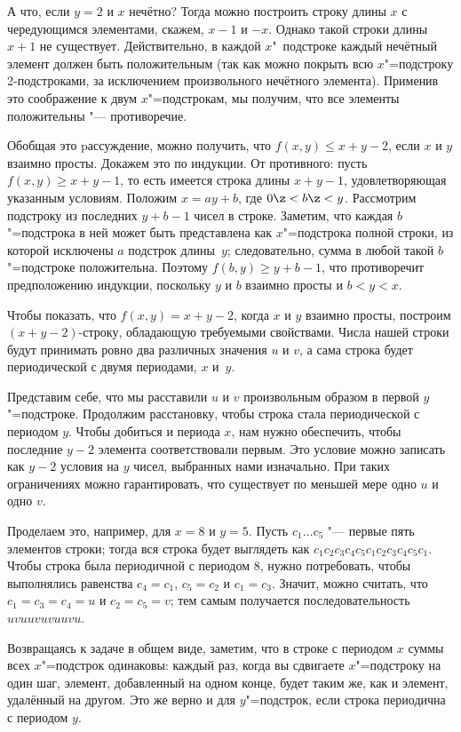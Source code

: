 \documentclass[twoside]{book}
\begin{document}
А что, если $y=2$ и $x$ нечётно?  Тогда можно построить строку длины
$x$ с чередующимся элементами, скажем, $x-1$ и $-x$.
Однако такой
строки длины $x+1$ не существует.
Действительно, в каждой
$x$"~подстроке каждый нечётный элемент должен быть положительным (так
как можно покрыть всю $x$"=подстроку 2-подстроками, за исключением
произвольного нечётного элемента).
Применив это соображение к двум
$x$"=подстрокам, мы получим, что все элементы положительны "---
противоречие.

Обобщая это pассуждение, можно получить, что $f(x,y)\le x+y-2$, если $x$ и $y$ взаимно просты.
Докажем это по индукции.
От противного: пусть $f(x,y)\ge x+y-1$,
то есть имеется строка длины $x+y-1$, удовлетворяющая указанным условиям.
Положим $x=ay+b$, где $0\z<b\z<y$.
Рассмотрим подстроку из последних $y+b-1$ чисел в строке.
Заметим, что каждая $b$"=подстрока в ней 
может быть представлена как $x$"=подстрока полной строки, 
из которой исключены $a$ подстрок длины~$y$; 
следовательно, сумма в любой такой $b$"=подстроке положительна.
Поэтому
$f(b,y)\ge y+b-1$,
что противоречит предположению индукции, поскольку $y$ и $b$ взаимно просты и $b<y<x$. %

Чтобы показать, что $f(x,y)=x+y-2$, когда $x$ и $y$ взаимно просты, 
построим $(x+y-2)$-строку, обладающую требуемыми свойствами.
%
Числа нашей строки будут принимать ровно два различных значения $u$ и
$v$, а сама строка будет периодической с двумя периодами, $x$ и~$y$.

Представим себе, что мы расставили $u$ и $v$ произвольным образом в
первой $y$"=подстроке.
Продолжим расстановку, чтобы строка стала
периодической с периодом $y$.
Чтобы добиться и периода $x$, нам нужно
обеспечить, чтобы последние $y-2$ элемента соответствовали первым.
Это условие можно записать как $y-2$ условия на $y$ чисел, выбранных
нами изначально.
При таких ограничениях можно гарантировать, что
существует по меньшей мере одно $u$ и одно $v$.

Проделаем это, например, для $x=8$ и $y=5$.
Пусть $c_1\dots c_5$ "---
первые пять элементов строки; тогда вся строка будет выглядеть как
$c_1c_2c_3c_4c_5c_1c_2c_3c_4c_5c_1$.
Чтобы строка была
периодичной с периодом 8, нужно потребовать, чтобы выполнялись
равенства $c_4=c_1$, $c_5=c_2$ и $c_1=c_3$.
Значит, можно считать,
что $c_1=c_3=c_4=u$ и $c_2=c_5=v$; тем самым получается
последовательность $uvuuvuvuuvu$.

Возвращаясь к задаче в общем виде, заметим, что в строке с периодом
$x$ суммы всех $x$"=подстрок одинаковы: каждый раз, когда вы
сдвигаете $x$"=подстроку на один шаг, элемент, добавленный на одном
конце, будет таким же, как и элемент, удалённый на другом.
Это же верно и для $y$"=подстрок, если строка периодична с периодом $y$.
\end{document}
